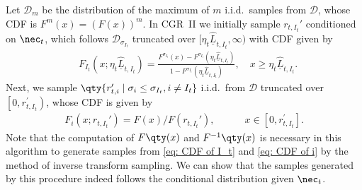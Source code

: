 Let $\mathcal{D}_{m}$ be the distribution of the maximum of $m$ i.i.d.~samples from $\mathcal{D}$,
whose CDF is $F^{m}(x)=(F(x))^m$.
In CGR~II we initially sample $r_{t,I_t}'$ conditioned on $\nec_t$,
which follows $\mathcal{D}_{\sigma_{I_t}}$ truncated over
$[\eta_t\underline{\hat{L}}_{t,I_t}, \infty)$
with CDF given by
\begin{align}
&    F_{I_t}(x; \eta_t\underline{\hat{L}}_{t,I_t})=\frac{F^{\sigma_{I_t}}(x)-F^{\sigma_{I_t}}(\eta_t\underline{\hat{L}}_{t,I_t})}{1-F^{\sigma_{I_t}}(\eta_t\underline{\hat{L}}_{t,I_t})},\quad x\ge \eta_t\underline{\hat{L}}_{t,I_t}.
    \label{eq: CDF of I_t}
\end{align}
Next, we sample $\qty{r_{t,i}^{\prime} \mid \allowbreak\sigma_i \leq \sigma_{I_t}, i \neq I_t}$ i.i.d.~from $\mathcal{D}$
truncated over $\left[0, r_{t,I_t}^{\prime}\right)$, whose CDF is given by
\begin{align}
    F_{i}(x; r_{t,I_t}')=F(x)/F(r_{t,I_t}'),
\qquad\quad x\in[0,r_{t,I_t}^{\prime}].
    \label{eq: CDF of i}
\end{align}
Note that the computation of $F\qty(x)$ and $F^{-1}\qty(x)$ is necessary in this algorithm to generate
samples from \eqref{eq: CDF of I_t} and \eqref{eq: CDF of i} by the method of inverse transform sampling.
We can show that the samples generated by this procedure indeed follows the conditional distribution given $\nec_t$.



